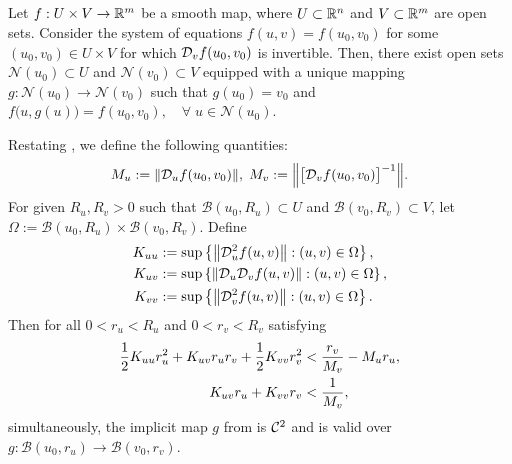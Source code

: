 \documentclass[a4paper]{cas-dc}
\begin{document}
\subsection{\ImFT{}}
\label{ssec:imft}

\begin{theorem}
    \label{thm:imft}
    \cite[Theorem~4.B]{zeidler2013vol1}
    Let \(f : U \times V \to \R[m]\) be a smooth map, where \(U \subset \R[n]\) and \(V \subset \R[m]\) are open sets. Consider the system of equations \(f(u,v) = f(u_0,v_0)\) for some \((u_0,v_0) \in U \times V\) for which \(\D[v]f(u_0,v_0)\) is invertible. Then, there exist open sets \(\mathcal{N}(u_0) \subset U\) and \(\mathcal{N}(v_0) \subset V\) equipped with a unique mapping \(g : \mathcal{N}(u_0) \to \mathcal{N}(v_0)\) such that \(g(u_0)=v_0\) and \(f\bigl(u,g(u)\bigr)=f(u_0,v_0), \quad \forall \; u\in\mathcal{N}(u_0)\).
\end{theorem}

\begin{theorem}
    \label{thm:imft2}
    Restating \cite[Theorem 3.3]{jindal2024estimates}, we define the following quantities:
    \begin{equation}
        M_{u} := \norm{\D[u]f(u_0,v_0)}, \; M_{v} := \norm{\bigl[\D[v]f(u_0,v_0)\bigr]^{-1}}.
        \label{def:imft2-Ms}
    \end{equation}
    For given \(R_u,R_v>0\) such that \(\mathcal{B}(u_0,R_u) \subset U\) and \(\mathcal{B}(v_0,R_v) \subset V\), let \(\Omega := \mathcal{B}(u_0,R_u)\times\mathcal{B}(v_0,R_v)\). Define%
    \begin{subequations}
        \begin{align}
            \Kuu & :=\sup\left\{\norm{\D[u]^2f(u,v)}    : (u,v) \in \Omega\right\} \label{def:K_uu}, \\
            \Kuv & :=\sup\left\{\norm{\D[u]\D[v]f(u,v)} : (u,v) \in \Omega\right\} \label{def:K_uv}, \\
            \Kvv & :=\sup\left\{\norm{\D[v]^2f(u,v)}    : (u,v) \in \Omega\right\} \label{def:K_vv}.
        \end{align} \label{def:Ks}
    \end{subequations}
    Then for all \(0<r_u<R_u\) and \(0<r_v<R_v\) satisfying
    \begin{subequations}
        \begin{align}
            \frac12 \Kuu r_{u}^2 + \Kuv r_{u}r_{v} + \frac12 \Kvv r_{v}^2 & < \frac{r_v}{M_v} - M_{u}r_{u}, \label{eq:imft2.1} \\
            \Kuv r_{u} + \Kvv r_{v}                                       & < \frac{1}{M_v}, \label{eq:imft2.2}
        \end{align} \label{eq:imft2}
    \end{subequations}
    simultaneously, the implicit map \(g\) from  is \(\C[2]\) and is valid over \(g:\mathcal{B}(u_0,r_u)\to\mathcal{B}(v_0,r_v)\).
\end{theorem}
\end{document}
